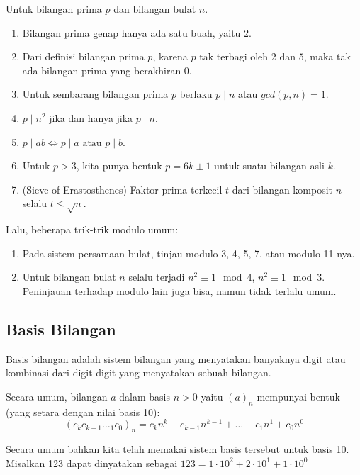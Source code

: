 \documentclass[11pt]{scrartcl}
\begin{document}
    Untuk bilangan prima $p$ dan bilangan bulat $n$.
    \begin{enumerate}
        \item Bilangan prima genap hanya ada satu buah, yaitu 2.
        \item Dari definisi bilangan prima $p$, karena $p$ tak terbagi oleh $2$ dan $5$, maka tak ada bilangan prima yang berakhiran $0$.
        \item Untuk sembarang bilangan prima $p$ berlaku $p \mid n$ atau $gcd(p,n)=1$.
        \item $p \mid n^2$ jika dan hanya jika $p \mid n$.
        \item $p \mid ab \iff p \mid a \text{ atau } p \mid b$.
        \item Untuk $p > 3$, kita punya bentuk $p = 6k \pm 1$ untuk suatu bilangan asli $k$.
        \item (Sieve of Erastosthenes) 
        Faktor prima terkecil $t$ dari bilangan komposit $n$ selalu $t \le \sqrt{n}$.
        \end{enumerate}
        
    Lalu, beberapa trik-trik modulo umum:
    \begin{enumerate}
        \item Pada sistem persamaan bulat, tinjau modulo 3, 4, 5, 7, atau modulo 11 nya.
        \item Untuk bilangan bulat $n$ selalu terjadi $n^2 \equiv 1 \mod 4$, $n^2 \equiv 1 \mod 3$. Peninjauan terhadap modulo lain juga bisa, namun tidak terlalu umum.
    \end{enumerate}
    
    \subsection{Basis Bilangan}
    Basis bilangan adalah sistem bilangan yang menyatakan banyaknya digit atau kombinasi dari digit-digit yang menyatakan sebuah bilangan.
    
    Secara umum, bilangan $a$ dalam basis $n > 0$ yaitu $(a)_n$ mempunyai bentuk (yang setara dengan nilai basis 10):
    $$(c_kc_{k-1}\dotsc_1c_0)_n = c_{k}n^k + c_{k-1}n^{k-1}+\dots+c_1n^{1}+c_0n^{0}$$
    
    Secara umum bahkan kita telah memakai sistem basis tersebut untuk basis 10. Misalkan 123 dapat dinyatakan sebagai $123 = 1\cdot 10^2 + 2\cdot 10^1 + 1\cdot 10^0$
    
\end{document}
